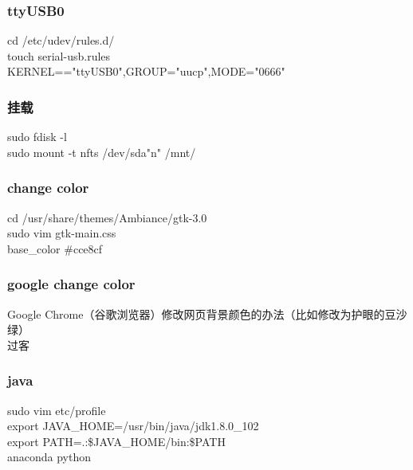 \documentclass{beamer}
\newcommand{\quotes}[1]{"#1"}
\begin{document}
\begin{CJK}{UTF8}{gkai}
 \begin{frame}\frametitle{ttyUSB0}
   cd /etc/udev/rules.d/ \\
   touch serial-usb.rules\\
   KERNEL=="ttyUSB0",GROUP="uucp",MODE="0666"
 \end{frame}

 \begin{frame}\frametitle{挂载}
   sudo fdisk -l\\
   sudo mount -t nfts /dev/sda\quotes{n} /mnt/
 \end{frame}

\begin{frame}\frametitle{change color}
   cd /usr/share/themes/Ambiance/gtk-3.0\\ %
   sudo vim gtk-main.css\\
   base\_color \#cce8cf\\
\end{frame}

 \begin{frame}\frametitle{google change color}
   Google Chrome（谷歌浏览器）修改网页背景颜色的办法（比如修改为护眼的豆沙绿）  \\
   过客\\
 \end{frame}

  \begin{frame}\frametitle{java}
    sudo vim etc/profile\\
    export JAVA\_HOME=/usr/bin/java/jdk1.8.0\_102\\
    export PATH=.:\$JAVA\_HOME/bin:\$PATH\\
    anaconda python\\
  \end{frame}


\end{CJK}
\end{document}
